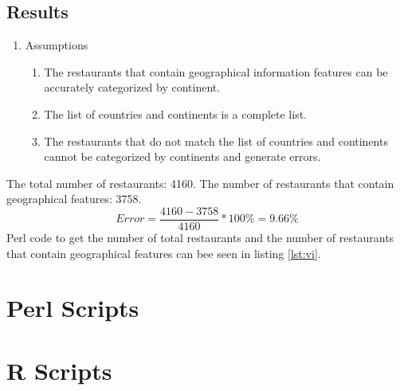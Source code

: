 \documentclass[letterpaper,10pt]{article}
\begin{document}
\subsection*{Results}
\begin{enumerate}
\item Assumptions 
\begin{enumerate}
\item The restaurants that contain geographical information features can be accurately categorized by continent.
\item The list of countries and continents is a complete list.
\item The restaurants that do not match the list of countries and continents cannot be categorized by continents and generate errors.
\end{enumerate} 
\end{enumerate}
The total number of restaurants: 4160.
The number of restaurants that contain geographical features: 3758.
$$Error=\frac{4160 - 3758}{4160} * 100\% = 9.66\%$$ 
Perl code to get the number of total restaurants and the number of restaurants that contain geographical features can bee seen in listing \hyperref[lst:vi]{\ref{lst:vi}}.
\newpage
\begin{appendices}
\section*{Perl Scripts}


\section*{R Scripts}



\end{appendices}
\end{document}
